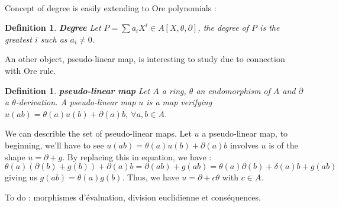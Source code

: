 \documentclass[a4paper]{llncs}
\newtheorem{defn}[thm]{Definition}
\begin{document}
\paragraph{}
Concept of degree is easily extending to Ore polynomials :

\begin{defn}{\textbf{Degree}}
Let $P = \sum a_iX^i \in A[X, \theta, \partial]$, the degree of $P$ is the greatest $i$ such as $a_i \ne 0$.
\end{defn} 

An other object, pseudo-linear map, is interesting to study due to connection with Ore rule. 

\begin{defn}{\textbf{pseudo-linear map}} 
Let $A$ a ring, $\theta$ an endomorphism of $A$ and $\partial$ a $\theta$-derivation. A pseudo-linear map $u$ is a map verifying $u(ab) = \theta (a)u(b) + \partial(a)b,\  \forall a, b \in A$.
\end{defn}

We can describle the set of pseudo-linear maps. Let $u$ a pseudo-linear map, to beginning, we'll have to see $u(ab) = \theta(a)u(b) + \partial(a)b$ involves $u$ is of the shape $u = \partial + g$. By replacing this in equation, we have : $$\theta (a)(\partial (b) + g(b)) + \partial (a)b = \partial (ab) +  g(ab) = \theta (a) \partial (b) + \delta (a)b + g(ab)$$ giving us $g(ab) = \theta (a) g(b)$. Thus, we have $u = \partial + c \theta$ with $c \in A$.

To do : morphismes d'évaluation, division euclidienne et conséquences.
\end{document}
